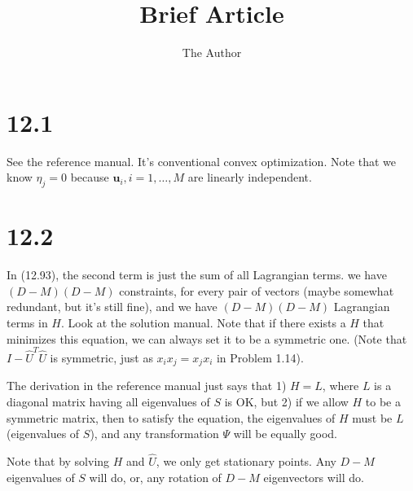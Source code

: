 \documentclass[12pt]{article}
\title{Brief Article}
\author{The Author}
\newcommand{\vect}[1]{\boldsymbol{#1}}
\begin{document}
\maketitle





\section{12.1} %
\label{sec:12_1}

See the reference manual. It's conventional convex optimization. Note that we know $\eta_j = 0$ because $\vect{u}_i, i = 1,\ldots,M$ are linearly independent.

\section{12.2} %
\label{sec:12_2}
In (12.93), the second term is just the sum of all Lagrangian terms. we have $(D-M)(D-M)$ constraints, for every pair of vectors (maybe somewhat redundant, but it's still fine), and we have $(D-M)(D-M)$ Lagrangian terms in $H$. Look at the solution manual. Note that if there exists a $H$ that minimizes this equation, we can always set it to be a symmetric one. (Note that $I- \hat{U}^T \hat{U}$ is symmetric, just as $x_i x_j = x_j x_i$ in Problem 1.14).

The derivation in the reference manual just says that 1) $H=L$, where $L$ is a diagonal matrix having all eigenvalues of $S$ is OK, but 2) if we allow $H$ to be a symmetric matrix, then to satisfy the equation, the eigenvalues of $H$ must be $L$ (eigenvalues of $S$), and any transformation $\Psi$ will be equally good. 

Note that by solving $H$ and $\hat{U}$, we only get stationary points. Any $D-M$ eigenvalues of $S$ will do, or, any rotation of $D-M$ eigenvectors will do. 
\end{document}

